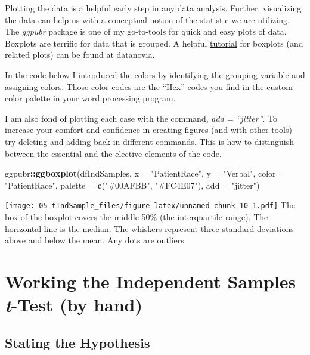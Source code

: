 \documentclass[
  11pt,
]{book}
\newenvironment{Shaded}{\begin{snugshade}}{\end{snugshade}}
\newcommand{\AttributeTok}[1]{\textcolor[rgb]{0.27,0.27,0.27}{#1}}
\newcommand{\FunctionTok}[1]{\textcolor[rgb]{0.27,0.27,0.27}{\textbf{#1}}}
\newcommand{\NormalTok}[1]{#1}
\newcommand{\SpecialCharTok}[1]{\textcolor[rgb]{0.43,0.43,0.43}{\textbf{#1}}}
\newcommand{\StringTok}[1]{\textcolor[rgb]{0.5,0.5,0.5}{#1}}
\begin{document}
Plotting the data is a helpful early step in any data analysis. Further, visualizing the data can help us with a conceptual notion of the statistic we are utilizing. The \emph{ggpubr} package is one of my go-to-tools for quick and easy plots of data. Boxplots are terrific for data that is grouped. A helpful \href{https://rpkgs.datanovia.com/ggpubr/}{tutorial} for boxplots (and related plots) can be found at datanovia.

In the code below I introduced the colors by identifying the grouping variable and assigning colors. Those color codes are the ``Hex'' codes you find in the custom color palette in your word processing program.

I am also fond of plotting each case with the command, \emph{add = ``jitter''}. To increase your comfort and confidence in creating figures (and with other tools) try deleting and adding back in different commands. This is how to distinguish between the essential and the elective elements of the code.

\begin{Shaded}
\begin{Highlighting}[]
\NormalTok{ggpubr}\SpecialCharTok{::}\FunctionTok{ggboxplot}\NormalTok{(dfIndSamples, }\AttributeTok{x =} \StringTok{"PatientRace"}\NormalTok{, }\AttributeTok{y =} \StringTok{"Verbal"}\NormalTok{, }\AttributeTok{color =} \StringTok{"PatientRace"}\NormalTok{,}
    \AttributeTok{palette =} \FunctionTok{c}\NormalTok{(}\StringTok{"\#00AFBB"}\NormalTok{, }\StringTok{"\#FC4E07"}\NormalTok{), }\AttributeTok{add =} \StringTok{"jitter"}\NormalTok{)}
\end{Highlighting}
\end{Shaded}

\texttt{[image: 05-tIndSample\_files/figure-latex/unnamed-chunk-10-1.pdf]} The box of the boxplot covers the middle 50\% (the interquartile range). The horizontal line is the median. The whiskers represent three standard deviations above and below the mean. Any dots are outliers.

\hypertarget{working-the-independent-samples-t-test-by-hand}{%
\section{\texorpdfstring{Working the Independent Samples \emph{t}-Test (by hand)}{Working the Independent Samples t-Test (by hand)}}\label{working-the-independent-samples-t-test-by-hand}}

\hypertarget{stating-the-hypothesis-1}{%
\subsection{Stating the Hypothesis}\label{stating-the-hypothesis-1}}
\end{document}
